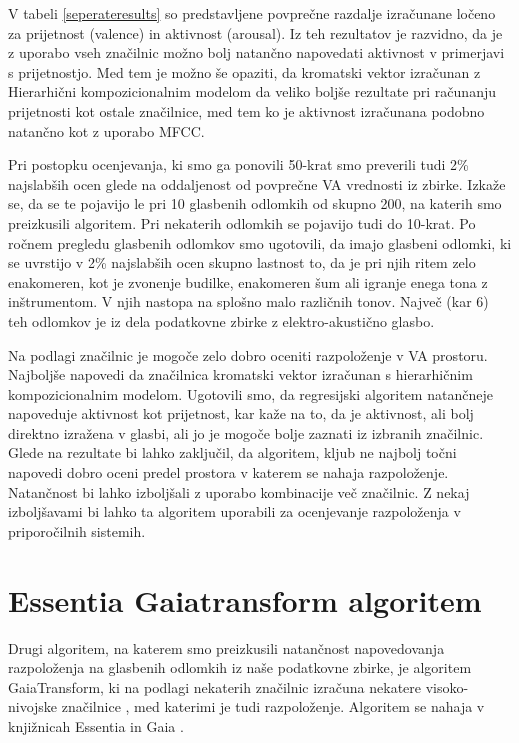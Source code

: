 \documentclass[a4paper, 12pt]{book}
\begin{document}
{V tabeli \ref{seperateresults} so predstavljene povprečne razdalje  izračunane ločeno za prijetnost (valence) in aktivnost (arousal). Iz teh rezultatov je razvidno, da je z uporabo vseh značilnic možno bolj natančno  napovedati aktivnost v primerjavi s prijetnostjo. Med tem je možno še opaziti, da kromatski vektor izračunan z Hierarhični kompozicionalnim modelom da veliko boljše rezultate pri računanju prijetnosti kot ostale značilnice, med tem ko je aktivnost izračunana podobno natančno kot z uporabo MFCC. 

Pri postopku ocenjevanja, ki smo ga ponovili 50-krat smo preverili tudi 2\% najslabših ocen glede na oddaljenost od povprečne VA vrednosti iz zbirke. Izkaže se, da se te pojavijo le pri 10 glasbenih odlomkih od skupno 200, na katerih smo preizkusili algoritem. Pri nekaterih odlomkih se pojavijo tudi do 10-krat. Po ročnem pregledu glasbenih odlomkov smo ugotovili, da imajo glasbeni odlomki, ki se uvrstijo v 2\% najslabših ocen skupno lastnost to, da je pri njih ritem zelo enakomeren, kot je zvonenje budilke, enakomeren šum ali igranje enega tona z inštrumentom. V njih nastopa na splošno malo različnih tonov. Največ (kar 6) teh odlomkov je iz dela podatkovne zbirke z elektro-akustično glasbo.   

Na podlagi značilnic je mogoče zelo dobro oceniti razpoloženje v VA prostoru. Najboljše napovedi da značilnica kromatski vektor izračunan s hierarhičnim kompozicionalnim modelom. Ugotovili smo, da regresijski algoritem natančneje napoveduje aktivnost kot prijetnost, kar kaže na to, da je aktivnost, ali bolj direktno izražena v glasbi, ali jo je mogoče bolje zaznati iz izbranih značilnic. Glede na rezultate bi lahko zaključil, da algoritem, kljub ne najbolj točni napovedi dobro oceni predel prostora v katerem se nahaja razpoloženje. Natančnost bi lahko izboljšali z uporabo kombinacije več značilnic. Z nekaj izboljšavami bi lahko ta algoritem uporabili za ocenjevanje razpoloženja v priporočilnih sistemih.

\section{Essentia Gaiatransform algoritem}

Drugi algoritem, na katerem smo preizkusili natančnost napovedovanja razpoloženja na glasbenih odlomkih iz naše podatkovne zbirke, je algoritem GaiaTransform, ki na podlagi nekaterih značilnic izračuna nekatere visoko-nivojske značilnice \cite{bogdanov2013form}, med katerimi je tudi razpoloženje. Algoritem se nahaja v knjižnicah Essentia in Gaia \cite{bogdanov2013essentia}.

}
\end{document}
